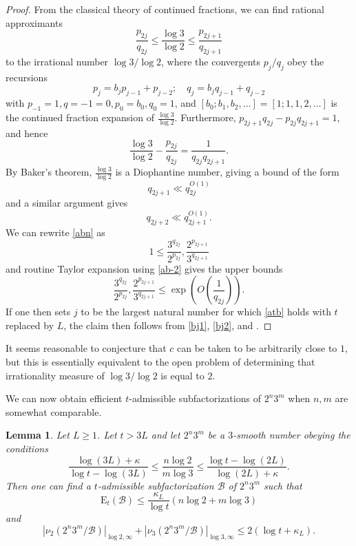 \documentclass[12pt,a4paper,reqno]{amsart}
\numberwithin{equation}{section}
\theoremstyle{plain}
\newtheorem{lemma}[theorem]{Lemma}
\theoremstyle{definition}
\newcommand\tuple{{\mathcal B}}
\newcommand\excess{{\mathrm{E}}}
\begin{document}
\begin{proof}  From the classical theory of continued fractions, we can find rational approximants
\begin{equation}\label{abn}
 \frac{p_{2j}}{q_{2j}} \leq \frac{\log 3}{\log 2} \leq \frac{p_{2j+1}}{q_{2j+1}}
\end{equation}
to the irrational number $\log 3/\log 2$, where the convergents $p_j/q_j$ obey the recursions
$$ p_j = b_j p_{j-1} + p_{j-2}; \quad q_j = b_j q_{j-1} + q_{j-2}$$
with $p_{-1} = 1, q={-1}=0, p_0 = b_0, q_0=1$, and $[b_0;b_1,b_2,\dots] = [1;1,1,2,\dots]$ is the continued fraction expansion of $\frac{\log 3}{\log 2}$.  Furthermore, $p_{2j+1}q_{2j} - p_{2j} q_{2j+1} = 1$, and hence
\begin{equation}\label{abn-2} 
  \frac{\log 3}{\log 2} - \frac{p_{2j}}{q_{2j}} = \frac{1}{q_{2j} q_{2j+1}}.
\end{equation}
By Baker's theorem, $\frac{\log 3}{\log 2}$ is a Diophantine number, giving a bound of the form
\begin{equation}\label{bj1}
   q_{2j+1} \ll q_{2j}^{O(1)}
\end{equation}
and a similar argument gives
\begin{equation}\label{bj2}
 q_{2j+2} \ll q_{2j+1}^{O(1)}.
\end{equation}
We can rewrite \eqref{abn} as
$$ 1 \leq \frac{3^{q_{2j}}}{2^{p_{2j}}}, \frac{2^{p_{2j+1}}}{3^{q_{2j+1}}}$$
and routine Taylor expansion using \eqref{ab-2} gives the upper bounds
$$ \frac{3^{q_{2j}}}{2^{p_{2j}}}, \frac{2^{p_{2j+1}}}{3^{q_{2j+1}}}\leq \exp\left( O\left( \frac{1}{q_{2j}}\right)\right).$$
If one then sets $j$ to be the largest natural number for which \eqref{atb} holds with $t$ replaced by $L$, the claim then follows from \eqref{bj1}, \eqref{bj2}, and .
\end{proof}


It seems reasonable to conjecture that $c$ can be taken to be arbitrarily close to $1$, but this is essentially equivalent to the open problem of determining that irrationality measure of $\log 3 / \log 2$ is equal to $2$.

We can now obtain efficient $t$-admissible subfactorizations of $2^n 3^m$ when $n,m$ are somewhat comparable.

\begin{lemma}\label{bound23}  Let $L \geq 1$.  Let $t > 3L$ and let $2^n 3^m$ be a $3$-smooth number obeying the conditions
\begin{equation}\label{B-bound}
\frac{\log(3L)+\kappa}{\log t - \log(3L)} \leq \frac{n \log 2}{m \log 3} \leq \frac{\log t - \log(2L)}{\log(2L)+\kappa}.
\end{equation}
Then one can find a $t$-admissible subfactorization $\tuple$ of $2^n 3^m$ such that
\begin{equation}\label{excess-bound} 
  \excess_t(\tuple) \leq \frac{\kappa_L}{\log t} (n \log 2 + m \log 3)
\end{equation}
and
\begin{equation}\label{surplus-bound} 
  |\nu_2(2^n 3^m/\tuple)|_{\log 2,\infty} + |\nu_3(2^n 3^m/\tuple)|_{\log 3,\infty}  \leq 2(\log t + \kappa_L).
\end{equation}
\end{lemma}
\end{document}
